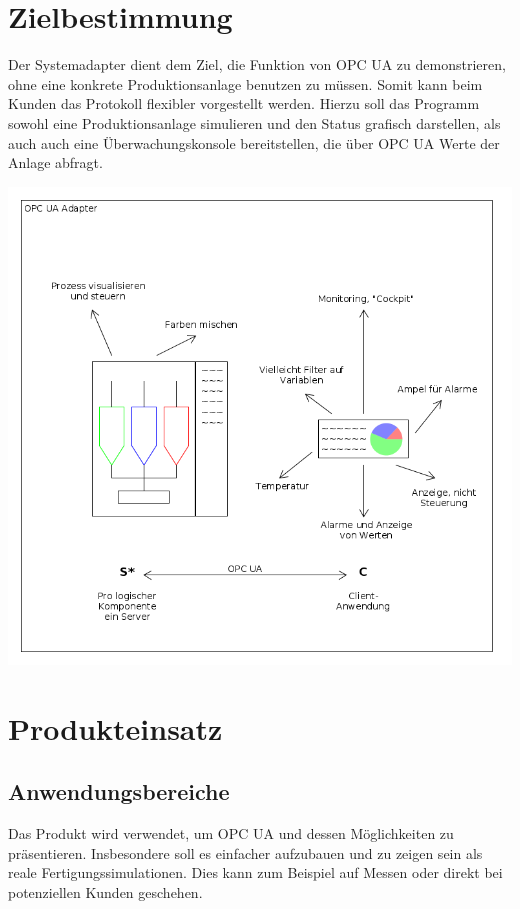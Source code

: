 \documentclass[parskip=full]{scrartcl}
\begin{document}
\section{Zielbestimmung}
Der Systemadapter dient dem Ziel, die Funktion von OPC UA zu demonstrieren, ohne eine konkrete Produktionsanlage
benutzen zu müssen. Somit kann beim Kunden das Protokoll flexibler vorgestellt werden. Hierzu soll das Programm
sowohl eine Produktionsanlage simulieren und den Status grafisch darstellen, als auch auch eine Überwachungskonsole
bereitstellen, die über OPC UA Werte der Anlage abfragt.\\
\begin{center}
    \includegraphics[scale=0.5]{../system-sketch.png}
\end{center}

\newpage
\section{Produkteinsatz}
\subsection{Anwendungsbereiche}
Das Produkt wird verwendet, um OPC UA und dessen Möglichkeiten zu präsentieren.
Insbesondere soll es einfacher aufzubauen und zu zeigen sein als reale Fertigungssimulationen.
Dies kann zum Beispiel auf Messen oder direkt bei potenziellen Kunden geschehen.
\end{document}
